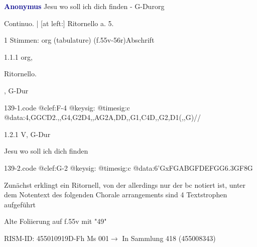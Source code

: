 \documentclass[twocolumn, 12pt]{book}
\begin{document}
\par \vspace{16pt} \textcolor{darkblue}{\textbf{Anonymus  }}\hfillplus{\textbf{[139]}}\newline Jesu wo soll ich dich finden - G-Dur\newline org
\par \begin{itshape}[f.55v, heading:] Continuo. | [at left:] Ritornello a. 5.\end{itshape} 
\par \textcolor{darkblue}{}  1 Stimmen: org (tabulature)  (f.55v-56r)\newline Abschrift
\par 1.1.1  org, \begin{itshape}Ritornello.\end{itshape}, G-Dur  
\begin{filecontents*}{139-1.code}
@clef:F-4
@keysig:
@timesig:c
@data:4,GGCD2.,,G4,G2D4,,AG2A,DD,,G1,C4D,,G2,D1(,,G)//
\end{filecontents*}
\newline %
\par 1.2.1  V, G-Dur\newline \begin{footnotesize} Jesu wo soll ich dich finden \end{footnotesize}  
\begin{filecontents*}{139-2.code}
@clef:G-2
@keysig:
@timesig:c
@data:{6'GxFGA}{BGFD}{EFGG}{6.3GF}8G
\end{filecontents*}
\newline %
\par Zunächst erklingt ein Ritornell, von der allerdings nur der bc notiert ist, unter dem Notentext des folgenden Chorale arrangements sind 4 Textstrophen aufgeführt
\par Alte Foliierung auf f.55v mit "49"
\par RISM-ID: 455010919\newline D-Fh  Ms 001\newline $\rightarrow$ In Sammlung 418 (455008343)
      
\end{document}
